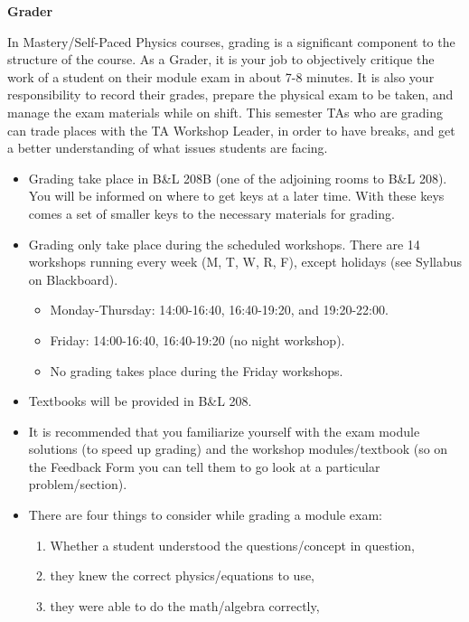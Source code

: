 \documentclass[12pt]{article}
\begin{document}
\hspace{1pt}

\begin{center}
\textbf{\Large Grader}
\end{center}

In Mastery/Self-Paced Physics courses, grading is a significant component to the structure of the course. As a Grader, it is your job to objectively critique the work of a student on their module exam in about 7-8 minutes. It is also your responsibility to record their grades, prepare the physical exam to be taken, and manage the exam materials while on shift. This semester TAs who are grading can trade places with the TA Workshop Leader, in order to have breaks, and get a better understanding of what issues students are facing.

\begin{itemize}
	\item Grading take place in B\&L 208B (one of the adjoining rooms to B\&L 208). You will be informed on where to get keys at a later time. With these keys comes a set of smaller keys to the necessary materials for grading.
	\item Grading only take place during the scheduled workshops. There are 14 workshops running every week (M, T, W, R, F), except holidays (see Syllabus on Blackboard).
	\begin{itemize}
		\item Monday-Thursday: 14:00-16:40, 16:40-19:20, and 19:20-22:00.
		\item Friday: 14:00-16:40, 16:40-19:20 (no night workshop).
		\item No grading takes place during the Friday workshops.
	\end{itemize}
	\item Textbooks will be provided in B\&L 208.
	\item It is recommended that you familiarize yourself with the exam module solutions (to speed up grading) and the workshop modules/textbook (so on the Feedback Form you can tell them to go look at a particular problem/section).
	\item There are four things to consider while grading a module exam:
		\begin{enumerate}
			\item Whether a student understood the questions/concept in question,
			\item they knew the correct physics/equations to use,
			\item they were able to do the math/algebra correctly,

\end{enumerate}
\end{itemize}
\end{document}
